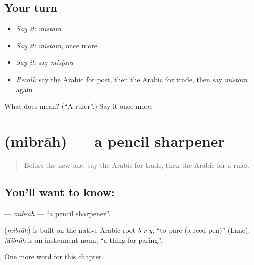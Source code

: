 \subsection*{Your turn}
\begin{itemize}
\raggedright
  \item \emph{Say it:} \emph{misṭara}
  \item \emph{Say it:} \emph{misṭara}, once more
  \item \emph{Say it:} say \emph{misṭara}
  \item \emph{Recall:} say the Arabic for post, then the Arabic for trade, then say \emph{misṭara} again
\end{itemize}

\begin{tcolorbox}[breakable,colback=teal!4,colframe=teal!35!black,title={Before you move on}]
What does  mean? (\textquotedblleft{}A ruler\textquotedblright{}.) Say it once more.
\end{tcolorbox}
\section[\texorpdfstring{\ar{مبراة} (mibrāh)}{مبراة (mibrāh)}]{ (mibrāh) — a pencil sharpener}

\label{lesson:AR-C253-mibrah}



\begin{quote}
Before the new one: say the Arabic for trade, then the Arabic for a ruler.
\end{quote}

\subsection*{You'll want to know: }
\textbf{} — \emph{mibrāh} — \textquotedblleft{}a pencil sharpener\textquotedblright{}.

\begin{cousinweb}
\textbf{} (\emph{mibrāh}) is built on the native Arabic root \emph{b-r-y}, \textquotedblleft{}to pare (a reed pen)\textquotedblright{} (Lane). \emph{Mibrāh} is an instrument noun, \textquotedblleft{}a thing for paring\textquotedblright{}.
\end{cousinweb}

\begin{grammarlens}[title={What you've built}]
One more word for this chapter.
\end{grammarlens}

